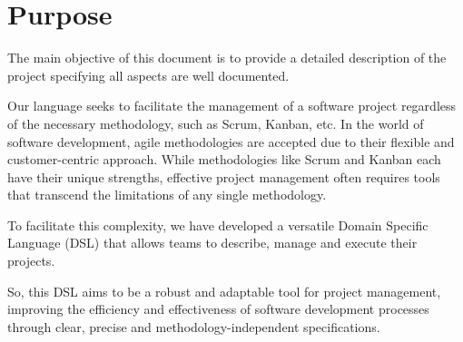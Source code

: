 \section{Purpose}
\label{sec:purpose}
The main objective of this document is to provide a detailed description of the project specifying all aspects are well documented.

Our language seeks to facilitate the management of a software project regardless of the necessary methodology, such as Scrum, Kanban, etc. In the world of software development, agile methodologies are accepted due to their flexible and customer-centric approach. While methodologies like Scrum and Kanban each have their unique strengths, effective project management often requires tools that transcend the limitations of any single methodology.

To facilitate this complexity, we have developed a versatile Domain Specific Language (DSL) that allows teams to describe, manage and execute their projects.

So, this DSL aims to be a robust and adaptable tool for project management, improving the efficiency and effectiveness of software development processes through clear, precise and methodology-independent specifications.
